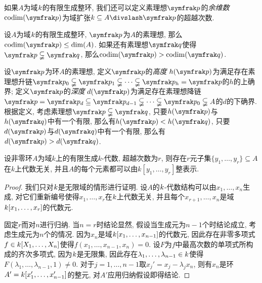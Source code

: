 如果$A$为域$k$的有限生成整环, 我们还可以定义素理想$\ideal{p}$的\emph{余维数} $\codim (\ideal{p})$为域扩张$k\subseteq A{\divslash}\ideal{p}$的超越次数.

\begin{propositionnoproof}\label{prop:primeidealdim}
  设$A$为域$k$的有限生成整环, $\ideal{p}$为$A$的素理想, 那么$\codim (\ideal{p})\leq\dim (A)$. 如果还有素理想$\ideal{q}$使得$\ideal{p}\subsetneqq\ideal{q}$, 那么$\codim (\ideal{p})>\codim (\ideal{q})$.
\end{propositionnoproof}

设$\ideal{p}$为环$A$的素理想,  定义$\ideal{p}$的\emph{高度} $h(\ideal{p})$为满足存在素理想升链$\ideal{p}_0\subsetneqq\ideal{p}_1\subsetneqq\dotsb\subsetneqq \ideal{p}_h=\ideal{p}$的$h$的上确界; 定义$\ideal{p}$的\emph{深度} $d(\ideal{p})$为满足存在素理想降链$\ideal{p}=\ideal{p}_d\subseteqq\ideal{p}_{d-1}\subsetneqq\dotsb\subsetneqq\ideal{p}_0\subsetneqq A$的$d$的下确界. 根据定义, 考虑素理想$\ideal{p}\subsetneqq\ideal{q}$, 只要$h(\ideal{p})$与$h(\ideal{q})$中有一个有限, 那么有$h(\ideal{p})<h(\ideal{q})$, 只要$d(\ideal{p})$与$d(\ideal{q})$中有一个有限, 那么有$d(\ideal{p})>d(\ideal{q})$.

\begin{proposition}\label{prop:noethernormalization}
  设非零环$A$为域$k$上的有限生成$k$-代数, 超越次数为$r$, 则存在$r$元子集$\{y_1, \dotsc, y_r\}\subseteq A$在$k$上代数无关, 并且$A$的每个元素都可以由$k[y_1, \dotsc, y_r]$整表示.
\end{proposition}

\begin{proof}
  我们只对$k$是无限域的情形进行证明. 设$A$的$k$-代数结构可以由$x_1, \dotsc, x_n$生成, 对它们重新编号使得$x_1, \dotsc, x_r$在$k$上代数无关, 并且每个$x_{r+1}, \dotsc, x_n$是域$k [x_1, \dotsc, x_r]$的代数元.

  固定$r$而对$n$进行归纳. 当$n=r$时结论显然, 假设当生成元为$n-1$个时结论成立, 考虑生成元为$n$个的情况. 因为$x_n$是域$k [x_1, \dotsc, x_{n-1}]$的代数元, 因此存在非零多项式$f\in k [X_1, \dotsc, X_n]$使得$f(x_1, \dotsc, x_{n-1}, x_n)=0$. 设$F$为$f$中最高次数的单项式所构成的齐次多项式, 因为$k$是无限集, 因此存在$\lambda_1, \dotsc, \lambda_{n-1}\in k$使得$F(\lambda_1, \dotsc, \lambda_{n-1}, 1)\neq 0$. 对于$j=1, \dotsc, n-1$取$x_j'=x_j-\lambda_jx_n$, 则有$x_n$是环$A'=k [x_1', \dotsc, x_{n-1}']$的整元, 对$A'$应用归纳假设即得结论.
\end{proof}

